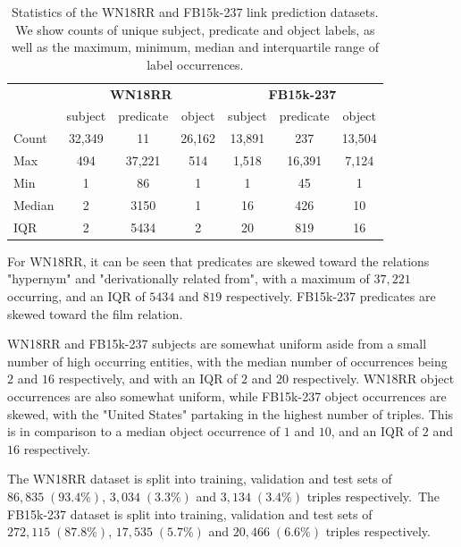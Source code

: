 \begin{table}[H]
	\begin{center}
	\begin{tabular}{|l|ccc|ccc|}
		\hline
 		& \multicolumn{3}{c|}{\textbf{WN18RR}} & \multicolumn{3}{c|}{\textbf{FB15k-237}} \\
		& subject & predicate & object & subject & predicate & object \\
		\hline 
		Count & 32,349 & 11 & 26,162 & 13,891 & 237 & 13,504 \\
		Max & 494 & 37,221 & 514 & 1,518 & 16,391 & 7,124 \\
		Min & 1 & 86 & 1 & 1 & 45 & 1 \\
		Median & 2 & 3150 & 1 & 16 & 426 & 10 \\
		IQR & 2 & 5434 & 2 & 20 & 819 & 16 \\
		\hline 
	\end{tabular}
	\end{center}
	\captionsetup{justification=centering}
	\caption{Statistics of the WN18RR and FB15k-237 link prediction datasets. We show counts of unique subject, predicate and object labels, as well as the maximum, minimum, median and interquartile range of label occurrences.}
\end{table}

\noindent For WN18RR, it can be seen that predicates are skewed toward the relations "hypernym" and "derivationally related from", with a maximum of $ 37, 221 $ occurring, and an IQR of $ 5434 $ and $ 819 $ respectively. FB15k-237 predicates are skewed toward the film relation. \par

\noindent WN18RR and FB15k-237 subjects are somewhat uniform aside from a small number of high occurring entities, with the median number of occurrences being $ 2 $ and $ 16 $ respectively, and with an IQR of $ 2 $ and $ 20 $ respectively. WN18RR object occurrences are also somewhat uniform, while FB15k-237 object occurrences are skewed, with the "United States" partaking in the highest number of triples. This is in comparison to a median object occurrence of $ 1 $ and $ 10 $, and an IQR of $ 2 $ and $ 16 $ respectively. \par

\noindent The WN18RR dataset is split into training, validation and test sets of $ 86, 835 \; (93.4 \%) $, $ 3, 034 \; (3.3 \%) $ and $ 3, 134\; (3.4 \%) $ triples respectively.\ The FB15k-237 dataset is split into training, validation and test sets of $ 272, 115 \; (87.8 \%) $, $ 17, 535 \; (5.7 \%) $ and $ 20, 466 \; (6.6 \%) $ triples respectively.

